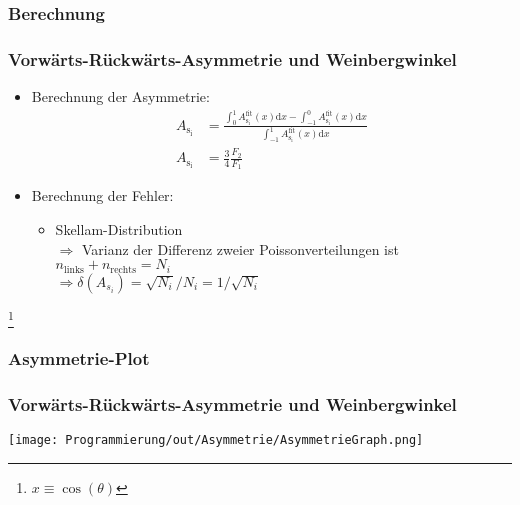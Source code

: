 \documentclass{beamer}
\newcommand\blfootnote[1]{%
  \begingroup
  \renewcommand\thefootnote{}\footnote{#1}%
  \addtocounter{footnote}{-1}%
  \endgroup
}
\begin{document}
\subsubsection{Berechnung}
\begin{frame}
	\frametitle{Vorwärts-Rückwärts-Asymmetrie und Weinbergwinkel}
	
	\begin{itemize}
		\item<1-> Berechnung der Asymmetrie:
		\begin{align*}
			A_{\mathrm{s_i}}
			&=
			\frac
			{
				\int_{0}^{1}  A^{\mathrm{fit}}_{\mathrm{s_i}}(x) \mathrm{d}x
				-
				\int_{-1}^{0} A^{\mathrm{fit}}_{\mathrm{s_i}}(x) \mathrm{d}x
			}
			{
				\int_{-1}^{1} A^{\mathrm{fit}}_{\mathrm{s_i}}(x) \mathrm{d}x
			}\\
				A_{\mathrm{s_i}}
				&=
				\frac{3}{4}
				\frac{F_2}{F_1}
		\end{align*}
		\item<2-> Berechnung der Fehler:
		\begin{itemize}
			\item Skellam-Distribution\\
			$\Rightarrow$ Varianz der Differenz zweier Poissonverteilungen ist $n_{\mathrm{links}}+n_{\mathrm{rechts}} = N_i$\\
			$\Rightarrow \delta(A_{s_i}) = \sqrt{N_i}/N_i = 1/\sqrt{N_i}$
		\end{itemize}
	\end{itemize}
	\blfootnote{$x \equiv \cos(\theta)$}
\end{frame}

\subsubsection{Asymmetrie-Plot}
\begin{frame}
	\frametitle{Vorwärts-Rückwärts-Asymmetrie und Weinbergwinkel}
	\texttt{[image: Programmierung/out/Asymmetrie/AsymmetrieGraph.png]}
\end{frame}
\end{document}
